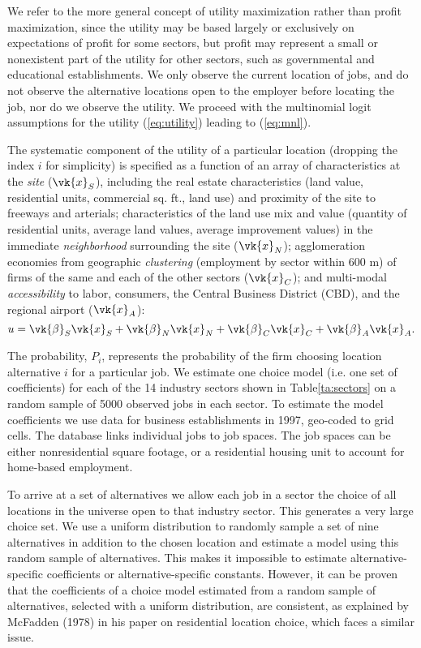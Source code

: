 We refer to the more general concept of utility maximization
rather than profit maximization, since the utility may be based
largely or exclusively on expectations of profit for some sectors,
but profit may represent a small or nonexistent part of the
utility for other sectors, such as governmental and educational
establishments. We only observe the current location of jobs, and
do not observe the alternative locations open to the employer
before locating the job, nor do we observe the utility. We proceed
with the multinomial logit assumptions for the utility
(\ref{eq:utility}) leading to (\ref{eq:mnl}).

The systematic component of the utility of a particular location
(dropping the index $i$ for simplicity) is specified as a function
of an array of characteristics at the \emph{site} ($\vk{x}_S$),
including the real estate characteristics (land value, residential
units, commercial sq. ft., land use) and proximity of the site to
freeways and arterials; characteristics of the land use mix and
value (quantity of residential units, average land values, average
improvement values) in the immediate \emph{neighborhood}
surrounding the site ($\vk{x}_N$); agglomeration economies from
geographic \emph{clustering} (employment by sector within 600 m)
of firms of the same and each of the other sectors ($\vk{x}_C$);
and multi-modal \emph{accessibility} to labor, consumers, the
Central Business District (CBD), and the regional airport
($\vk{x}_A$):
\begin{equation}
    u = \vk{\beta}_S \vk{x}_S
     + \vk{\beta}_N \vk{x}_N
     + \vk{\beta}_C \vk{x}_C
     + \vk{\beta}_A \vk{x}_A.
     \label{eq:uemploc}
\end{equation}

The probability, $P_i$, represents the probability of the firm
choosing location alternative $i$ for a particular job. We
estimate one choice model (i.e. one set of coefficients) for each
of the 14 industry sectors shown in Table\ref{ta:sectors} on a
random sample of 5000 observed jobs in each sector. To estimate
the model coefficients we use data for business establishments in
1997, geo-coded to grid cells. The database links individual jobs
to job spaces. The job spaces can be either nonresidential square
footage, or a residential housing unit to account for home-based
employment.

To arrive at a set of alternatives we allow each job in a sector
the choice of all locations in the universe open to that industry
sector. This generates a very large choice set. We use a uniform
distribution to randomly sample a set of nine alternatives in
addition to the chosen location and estimate a model using this
random sample of alternatives. This makes it impossible to
estimate alternative-specific coefficients or alternative-specific
constants. However, it can be proven that the coefficients of a
choice model estimated from a random sample of alternatives,
selected with a uniform distribution, are consistent, as explained
by McFadden (1978) in his paper on residential location choice,
which faces a similar issue.

